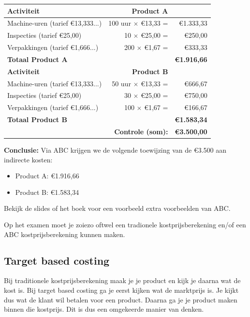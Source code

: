 \documentclass[a4paper,11pt]{article}
\begin{document}
\begin{oefenblok}[title=Oefening uit examen: Activity Based Costing (ABC)]
    \begin{tabular}{lrr}
    \hline
    \textbf{Activiteit} & \textbf{Product A}\\
    \hline
    Machine-uren (tarief €13,333...) & 100 uur $\times$ €13,33 = & €1.333,33 \\
    Inspecties (tarief €25,00) & 10 $\times$ €25,00 = & €250,00 \\
    Verpakkingen (tarief €1,666...) & 200 $\times$ €1,67 = & €333,33 \\
    \hline
    \textbf{Totaal Product A} & & \textbf{€1.916,66} \\
    \hline
    \textbf{Activiteit} & \textbf{Product B}\\
    \hline
    Machine-uren (tarief €13,333...) & 50 uur $\times$ €13,33 = & €666,67 \\
    Inspecties (tarief €25,00) & 30 $\times$ €25,00 = & €750,00 \\
    Verpakkingen (tarief €1,666...) & 100 $\times$ €1,67 = & €166,67 \\
    \hline
    \textbf{Totaal Product B} & & \textbf{€1.583,34} \\
    \hline
    \multicolumn{2}{r}{\textbf{Controle (som):}} & \textbf{€3.500,00} \\
    \hline
    \end{tabular}

    \vspace{2mm}
    \textbf{Conclusie:} Via ABC krijgen we de volgende toewijzing van de €3.500 aan indirecte kosten:
    \begin{itemize}
        \item Product A: €1.916,66
        \item Product B: €1.583,34
    \end{itemize}

\end{oefenblok}

Bekijk de slides of het boek voor een voorbeeld extra voorbeelden van ABC.

\begin{examenbox}
    Op het examen moet je zoiezo oftwel een tradionele kostprijsberekening
    en/of een ABC kostprijsberekening kunnen maken. 
\end{examenbox}
\subsection{Target based costing}

Bij traditionele kostprijsberekening maak je je product en kijk je daarna wat de kost is.
Bij target based costing ga je eerst kijken wat de marktprijs is.
Je kijkt dus wat de klant wil betalen voor een product.
Daarna ga je je product maken binnen die kostprijs.
Dit is dus een omgekeerde manier van denken.
\end{document}
